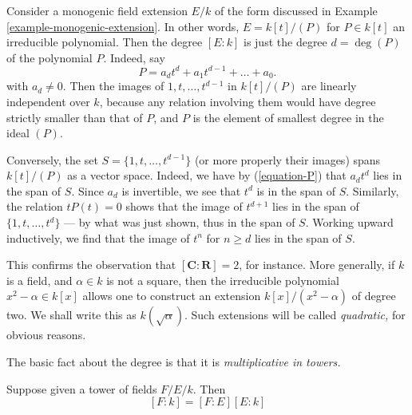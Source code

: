 \begin{example}
\label{example-degree-simple-algebraic-extension}
Consider a monogenic field extension $E/k$ of the form discussed in
Example \ref{example-monogenic-extension}.
In other words, $E = k[t]/(P)$ for $P \in k[t]$ an irreducible polynomial.
Then the degree $[E : k]$ is just the degree $d = \deg(P)$ of the
polynomial $P$. Indeed, say
\begin{equation}
\label{equation-P}
P = a_d t^d + a_1 t^{d - 1} + \ldots + a_0.
\end{equation}
with $a_d \not = 0$. Then the images of $1, t, \ldots, t^{d - 1}$ in
$k[t]/(P)$ are linearly independent over $k$, because any relation involving
them would have degree strictly smaller than that of $P$, and $P$ is the
element of smallest degree in the ideal $(P)$.

\medskip\noindent
Conversely, the set $S = \{1, t, \ldots, t^{d - 1}\}$ (or more
properly their images) spans $k[t]/(P)$ as a vector space.
Indeed, we have by (\ref{equation-P}) that $a_d t^d$ lies in the span of $S$.
Since $a_d$ is invertible, we see that $t^d$ is in the span of $S$.
Similarly, the relation $t P(t) = 0$ shows that the image of $t^{d + 1}$
lies in the span of $\{1, t, \ldots, t^d\}$ --- by what was just shown, thus
in the span of $S$. Working upward inductively, we find
that the image of $t^n$ for $n \geq d$ lies in the span of $S$.
\end{example}

\noindent
This confirms the observation that $[\mathbf{C}: \mathbf{R}] = 2$, for
instance. More generally, if $k$ is a field, and $\alpha \in k$ is not a
square, then the irreducible polynomial $x^2 - \alpha \in k[x]$ allows one
to construct an extension $k[x]/(x^2 - \alpha)$ of degree two.
We shall write this as $k(\sqrt{\alpha})$. Such extensions will be called
{\it quadratic,} for obvious reasons.

\medskip\noindent
The basic fact about the degree is that it is {\it multiplicative in towers.}

\begin{lemma}[Multiplicativity]
\label{lemma-multiplicativity-degrees}
Suppose given a tower of fields $F/E/k$. Then
$$
[F:k] = [F:E][E:k]
$$
\end{lemma}


